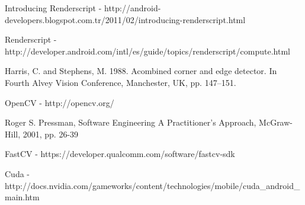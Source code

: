 \documentclass[12pt, a4paper]{article} \pagenumbering{gobble}
\begin{document}
\newpage
          \begin{thebibliography}{9}
            Introducing Renderscript -
              http://android-developers.blogspot.com.tr/2011/02/introducing-renderscript.html

            Renderscript - http://developer.android.com/intl/es/guide/topics/renderscript/compute.html

            Harris, C. and Stephens, M. 1988. Acombined corner and edge detector. In Fourth Alvey
            Vision Conference, Manchester, UK, pp. 147–151.

              OpenCV -  http://opencv.org/

            Roger S. Pressman, Software Engineering A Practitioner's Approach,
            McGraw-Hill, 2001, pp. 26-39

            FastCV - https://developer.qualcomm.com/software/fastcv-sdk

          Cuda - http://docs.nvidia.com/gameworks/content/technologies/mobile/cuda\_android\_main.htm

          \end{thebibliography}
\end{document}
